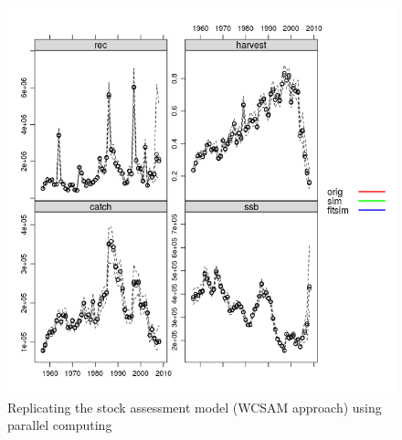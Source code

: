 \documentclass[a4paper,english,10pt]{article}\usepackage[]{graphicx}\usepackage[]{color}
\makeatletter
\def\maxwidth{ %
  \ifdim\Gin@nat@width>\linewidth
    \linewidth
  \else
    \Gin@nat@width
  \fi
}
\newenvironment{knitrout}{}{} %
\makeatother
\begin{document}
\begin{knitrout}
\color{fgcolor}\begin{figure}[H]

{\centering \includegraphics[width=\maxwidth]{figure/wcsampar-1} 

}

\caption[Replicating the stock assessment model (WCSAM approach) using parallel computing]{Replicating the stock assessment model (WCSAM approach) using parallel computing}\label{fig:wcsampar}
\end{figure}


\end{knitrout}



\end{document}
